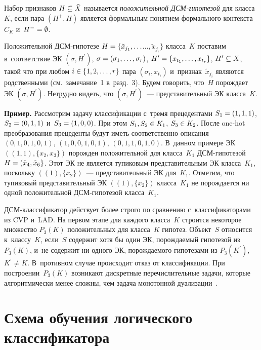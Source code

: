 \begin{multicols}{2}
  Набор признаков $H\hm\subseteq \tilde{X}$ называется 
\textit{положительной ДСМ-ги\-по\-те\-зой} для класса~$K$, если пара   $(H^+, H)$
является формальным понятием формального кон\-текс\-та~$C_K$ и~$H^-\hm= 
\emptyset$.
  
  Положительной ДСМ-ги\-по\-те\-зе $H\hm= \{ \tilde{x}_{j_1}, \ldots$\linebreak $\ldots , 
\tilde{x}_{j_r}\}$ класса~$K$ по\-ста\-вим в~соответствие ЭК $(\sigma, H^\prime)$, 
$\sigma\hm= (\sigma_1, \ldots, \sigma_r)$, $H^\prime\hm= 
  \{ x_{t_1}, \ldots , x_{t_r}\}$, $H^\prime\hm\subseteq X$, такой что при любом 
$i\hm\in \{1,2,\ldots , r\}$ пара $(\sigma_i, x_{t_i})$ и~при\-знак~$\tilde{x}_{j_i}$ 
являются родственными (см.\ замечание~1 в~разд.~3). Будем говорить, 
что~$H$ по\-рож\-да\-ет ЭК $(\sigma, H^\prime)$. Не\-труд\-но видеть, что $(\sigma, 
H^\prime)$~--- пред\-ста\-ви\-тель\-ный ЭК класса~$K$. 
  
  \smallskip
  
  \textbf{Пример.} Рассмотрим задачу классификации с~тремя прецедентами $S_1\hm= (1,1,1)$, 
$S_2\hm= (0,1,1)$ и~$S_3\hm= (1,0,0)$. При этом $S_1, S_2\hm\in K_1$, $S_3\hm\in K_2$. 
После one-hot преобразования прецеденты будут иметь соответственно описания 
$(0,1,0,1,0,1)$, $(1,0,0,1,0,1)$, $(0,1,1,0,1,0)$. В~данном примере ЭК $((1,1), \{ x_2, x_3\})$ 
по\-рож\-ден положительной для класса~$K_1$ 
 ДСМ-ги\-по\-те\-зой $H\hm= (\tilde{x}_4, \tilde{x}_6\}$. Этот ЭК не является тупиковым 
представительным ЭК класса~$K_1$, по\-сколь\-ку $((1), \{x_2\})$~--- пред\-ста\-ви\-тель\-ный ЭК 
для~$K_1$. Отметим, что тупиковый пред\-ста\-ви\-тель\-ный ЭК $((1), \{x_2\})$ класса~$K_1$ не 
по\-рож\-да\-ет\-ся ни одной положительной ДСМ-ги\-по\-те\-зой класса~$K_1$. 
  
  ДСМ-классификатор действует более строго по сравнению 
с~классификаторами из CVP и~LAD. На пер\-вом этапе для каж\-до\-го класса~$K$ 
строится некоторое множество $P_3(K)$ положительных для класса~$K$ 
гипотез. Объект~$S$ относится к~классу~$K$, если~$S$ содержит хотя бы один 
ЭК, по\-рож\-да\-емый гипотезой из $P_3(K)$, и~не содержит ни одного ЭК, 
порождаемого гипотезами из $P_3(K^\prime)$, $K^\prime \not= K$. 
В~про\-тив\-ном случае происходит отказ от классификации. При 
по\-стро\-ении~$P_3(K)$ возникают дискретные пе\-ре\-чис\-ли\-тель\-ные задачи, 
которые алгоритмически менее слож\-ны, чем задача монотонной 
дуа\-ли\-за\-ции~\cite{20-duk}.
  
\section{Схема обучения логического классификатора}


\end{multicols}

